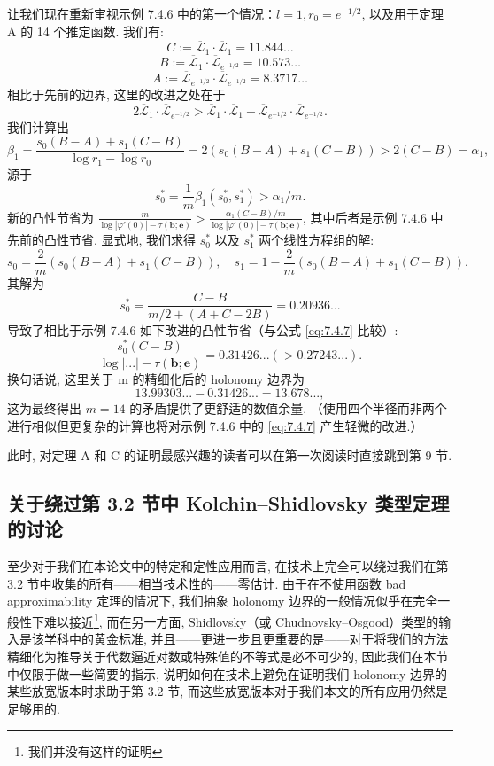 \begin{example}\label{ex:7.6.8}
让我们现在重新审视示例 7.4.6 中的第一个情况：\(l = 1, r_0 = e^{-1/2}\), 
以及用于定理 A 的 14 个推定函数. 我们有:
\[ C := \overline{\mathcal{L}}_1 \cdot \overline{\mathcal{L}}_1 = 11.844 \dots \]
\[ B := \overline{\mathcal{L}}_1 \cdot \overline{\mathcal{L}}_{e^{-1/2}} = 10.573 \dots \]
\[ A := \overline{\mathcal{L}}_{e^{-1/2}} \cdot \overline{\mathcal{L}}_{e^{-1/2}} = 8.3717 \dots \]
相比于先前的边界, 这里的改进之处在于
\[ 2\overline{\mathcal{L}}_1 \cdot \overline{\mathcal{L}}_{e^{-1/2}} > \overline{\mathcal{L}}_1 \cdot \overline{\mathcal{L}}_1 + \overline{\mathcal{L}}_{e^{-1/2}} \cdot \overline{\mathcal{L}}_{e^{-1/2}}. \]
我们计算出
\[ \beta_1 = \frac{s_0(B-A) + s_1(C-B)}{\log r_1 - \log r_0} = 2(s_0(B-A) + s_1(C-B)) > 2(C-B) = \alpha_1, \]
源于
\[ s_0^* = \frac{1}{m} \beta_1(s_0^*, s_1^*) > \alpha_1/m. \]
新的凸性节省为 \(\frac{m}{\log |\varphi'(0)| - \tau(\mathbf{b}; \mathbf{e})} > \frac{\alpha_1(C-B)/m}{\log |\varphi'(0)| - \tau(\mathbf{b}; \mathbf{e})}\), 
其中后者是示例 7.4.6 中先前的凸性节省. 
显式地, 我们求得 \(s_0^*\) 以及 \(s_1^*\) 两个线性方程组的解:
\[ s_0 = \frac{2}{m}(s_0(B-A) + s_1(C-B)), \quad s_1 = 1 - \frac{2}{m}(s_0(B-A) + s_1(C-B)). \]
其解为
\[ s_0^* = \frac{C - B}{m/2 + (A + C - 2B)} = 0.20936... \]
导致了相比于示例 7.4.6 如下改进的凸性节省（与公式 \eqref{eq:7.4.7} 比较）:
\[ \frac{s_0^*(C-B)}{\log|...| - \tau(\mathbf{b}; \mathbf{e})} = 0.31426...(> 0.27243...). \]
换句话说, 这里关于 m 的精细化后的 holonomy 边界为
\begin{equation}\label{eq:7.6.9}
13.99303... - 0.31426... = 13.678...,
\end{equation}
这为最终得出 \(m=14\) 的矛盾提供了更舒适的数值余量. 
（使用四个半径而非两个进行相似但更复杂的计算也将对示例 7.4.6 中的 \eqref{eq:7.4.7} 产生轻微的改进.） \end{example}

此时, 对定理 A 和 C 的证明最感兴趣的读者可以在第一次阅读时直接跳到第 9 节.

\subsection{关于绕过第 3.2 节中 Kolchin--Shidlovsky 类型定理的讨论}\label{sec:7.7}

至少对于我们在本论文中的特定和定性应用而言, 在技术上完全可以绕过我们在第 3.2 节中收集的所有——相当技术性的——零估计. 
由于在不使用函数 bad approximability 定理的情况下, 我们抽象 holonomy 边界的一般情况似乎在完全一般性下难以接近\footnote{我们并没有这样的证明}, 
而在另一方面, Shidlovsky（或 Chudnovsky--Osgood）类型的输入是该学科中的黄金标准, 
并且——更进一步且更重要的是——对于将我们的方法精细化为推导关于代数逼近对数或特殊值的不等式是必不可少的, 
因此我们在本节中仅限于做一些简要的指示, 
说明如何在技术上避免在证明我们 holonomy 边界的某些放宽版本时求助于第 3.2 节, 
而这些放宽版本对于我们本文的所有应用仍然是足够用的.

